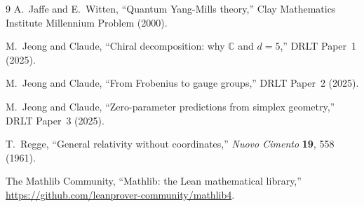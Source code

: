 \documentclass[12pt]{article}
\theoremstyle{definition}
\theoremstyle{remark}
\newcommand{\CC}{\mathbb{C}}
\begin{document}
\begin{thebibliography}{9}
A.~Jaffe and E.~Witten,
``Quantum Yang-Mills theory,''
Clay Mathematics Institute Millennium Problem (2000).

M.~Jeong and Claude,
``Chiral decomposition: why $\CC$ and $d = 5$,''
DRLT Paper~1 (2025).

M.~Jeong and Claude,
``From Frobenius to gauge groups,''
DRLT Paper~2 (2025).

M.~Jeong and Claude,
``Zero-parameter predictions from simplex geometry,''
DRLT Paper~3 (2025).

T.~Regge,
``General relativity without coordinates,''
\emph{Nuovo Cimento} \textbf{19}, 558 (1961).

The Mathlib Community,
``Mathlib: the Lean mathematical library,''
\url{https://github.com/leanprover-community/mathlib4}.
\end{thebibliography}
\end{document}
